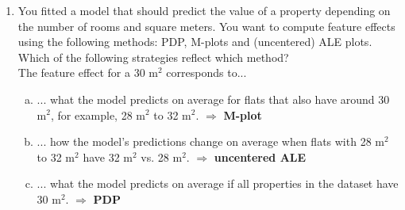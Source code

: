 {\begin{enumerate}
\item You fitted a model that should predict the value of a property depending on 
    the number of rooms and square meters. 
    You want to compute feature effects using the following methods: 
    PDP, M-plots and (uncentered) ALE plots. 
    Which of the following strategies reflect which method? \\
    The feature effect for a 30 m$^2$ corresponds to... 
\begin{enumerate}[a)]
  \item ... what the model predicts on average for flats that also have around 30 m$^2$, for example, 28 m$^2$ to 32 m$^2$. $\Rightarrow$ \textbf{M-plot}
  \item ... how the model's predictions change on average when flats with 28 m$^2$ to 32 m$^2$ have 32 m$^2$ vs. 28 m$^2$. $\Rightarrow$ \textbf{uncentered ALE}
  \item ... what the model predicts on average if all properties in the dataset have 30 m$^2$. $\Rightarrow$ \textbf{PDP}
\end{enumerate}

\end{enumerate}
}